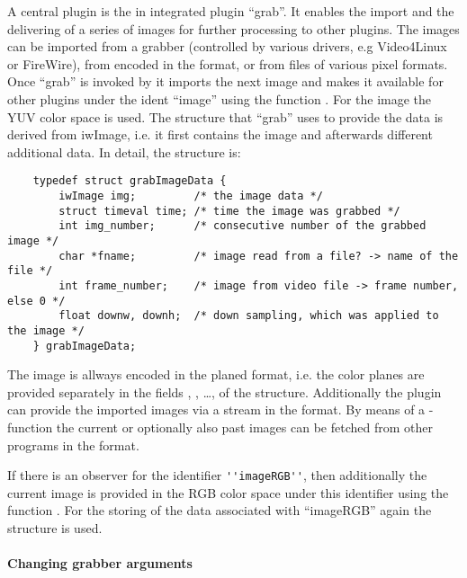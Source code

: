 A central plugin is the in \icewing{} integrated plugin ``grab''. It
enables the import and the delivering of a series of images for
further processing to other plugins. The images can be imported from
a grabber (controlled by various drivers, e.g Video4Linux or
FireWire), from \dacs{} encoded in the 
format, or from files of various pixel formats. Once ``grab'' is
invoked by \icewing{} it imports the next image and makes it
available for other plugins under the ident ``image'' using the
function . For the image the YUV color space
is used. The structure that ``grab'' uses to provide the data is
derived from iwImage, i.e. it first contains the image and
afterwards different additional data. In detail, the structure is:
\label{page:p_grabImageData}
\begin{small}
\linespread{0.9}
\begin{verbatim}
    typedef struct grabImageData {
        iwImage img;         /* the image data */
        struct timeval time; /* time the image was grabbed */
        int img_number;      /* consecutive number of the grabbed image */
        char *fname;         /* image read from a file? -> name of the file */
        int frame_number;    /* image from video file -> frame number, else 0 */
        float downw, downh;  /* down sampling, which was applied to the image */
    } grabImageData;
\end{verbatim}
\end{small}
The image is allways encoded in the planed format, i.e. the color
planes are provided separately in the fields ,
, \dots,  of the 
structure. Additionally the plugin can provide the imported images
via a \dacs{} stream in the  format. By means of a
\dacs{}-function the current or optionally also past images can be
fetched from other programs in the  format.

If there is an observer for the identifier \verb|''imageRGB''|, then
additionally the current image is provided in the RGB color space
under this identifier using the function
. For the storing of the data associated with
``imageRGB'' again the  structure is used.

\paragraph{Changing grabber arguments}\hfill\\

